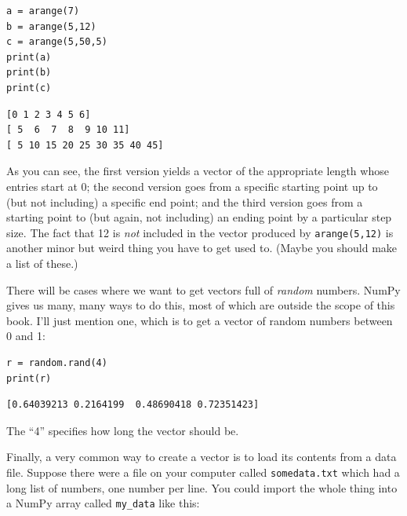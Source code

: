 \begin{Verbatim}[fontsize=\small,samepage=true,frame=single,framesep=3mm]
a = arange(7)
b = arange(5,12)
c = arange(5,50,5)
print(a)
print(b)
print(c)
\end{Verbatim}
\vspace{-.2in}

\begin{Verbatim}[fontsize=\small,samepage=true,frame=leftline,framesep=5mm,framerule=1mm]
[0 1 2 3 4 5 6]
[ 5  6  7  8  9 10 11]
[ 5 10 15 20 25 30 35 40 45]
\end{Verbatim}

As you can see, the first version yields a vector of the appropriate length
whose entries start at 0; the second version goes from a specific starting
point up to (but not including) a specific end point; and the third version
goes from a starting point to (but again, not including) an ending point by a
particular step size. The fact that 12 is \textit{not} included in the vector
produced by \texttt{arange(5,12)} is another minor but weird thing you have to
get used to. (Maybe you should make a list of these.)

\medskip
{}

There will be cases where we want to get vectors full of \textit{random}
numbers. NumPy gives us many, many ways to do this, most of which are outside
the scope of this book. I'll just mention one, which is to get a vector of
random numbers between 0 and 1:

\begin{Verbatim}[fontsize=\small,samepage=true,frame=single,framesep=3mm]
r = random.rand(4)
print(r)
\end{Verbatim}
\vspace{-.2in}

\begin{Verbatim}[fontsize=\small,samepage=true,frame=leftline,framesep=5mm,framerule=1mm]
[0.64039213 0.2164199  0.48690418 0.72351423]
\end{Verbatim}

The ``4'' specifies how long the vector should be.


Finally, a very common way to create a vector is to load its contents from a
data file. Suppose there were a file on your computer called
\texttt{somedata.txt} which had a long list of numbers, one number per line.
You could import the whole thing into a NumPy array called \texttt{my\_data}
like this:


